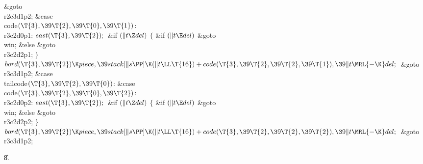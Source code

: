 \&{goto} \\{r2c3d1p2};\6
\4\&{case} \\{code}${}(\T{3},\39\T{2},\39\T{0},\39\T{1}){}$:\5
\\{r3c2d0p1}:\5
${}\\{east}(\T{3},\39\T{2});{}$\6
\&{if} ${}(\|t\Z\\{del}){}$\5
${}\{{}$\5
\1\&{if} ${}(\|t\E\\{del}){}$\1\5
\&{goto} \\{win};\5
\2\&{else}\1\5
\&{goto} \\{r3c2d2p1};\5
\2${}\}{}$\2\6
${}\\{bord}(\T{3},\39\T{2})\K\\{piece},\39\\{stack}[\|s\PP]\K(\|t\LL\T{16})+%
\\{code}(\T{3},\39\T{2},\39\T{2},\39\T{1}),\39\|t\MRL{-{\K}}\\{del};{}$\6
\&{goto} \\{r3c3d1p2};\6
\4\&{case} \\{tailcode}${}(\T{3},\39\T{2},\39\T{0}){}$:\5
\&{case} \\{code}${}(\T{3},\39\T{2},\39\T{0},\39\T{2}){}$:\5
\\{r3c2d0p2}:\5
${}\\{east}(\T{3},\39\T{2});{}$\6
\&{if} ${}(\|t\Z\\{del}){}$\5
${}\{{}$\5
\1\&{if} ${}(\|t\E\\{del}){}$\1\5
\&{goto} \\{win};\5
\2\&{else}\1\5
\&{goto} \\{r3c2d2p2};\5
\2${}\}{}$\2\6
${}\\{bord}(\T{3},\39\T{2})\K\\{piece},\39\\{stack}[\|s\PP]\K(\|t\LL\T{16})+%
\\{code}(\T{3},\39\T{2},\39\T{2},\39\T{2}),\39\|t\MRL{-{\K}}\\{del};{}$\6
\&{goto} \\{r3c3d1p2};\par
\U8.\fi

